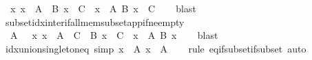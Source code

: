\begin{isabellebody}
\ \ {\isachardoublequoteopen}{\isacharparenleft}{\kern0pt}{\isasymAnd}x{\isachardot}{\kern0pt}\ x\ {\isasymin}\ A\ {\isasymLongrightarrow}\ B\ x\ {\isasymsubseteq}\ C{\isacharparenright}{\kern0pt}\ {\isasymLongrightarrow}\ {\isacharparenleft}{\kern0pt}{\isasymUnion}x\ {\isasymin}\ A{\isachardot}{\kern0pt}\ B\ x{\isacharparenright}{\kern0pt}\ {\isasymsubseteq}\ C{\isachardoublequoteclose}\isanewline
%
\isadelimproof
\ \ %
\endisadelimproof
%
\isatagproof
{}\isamarkupfalse%
\ blast%
\endisatagproof
{\isafoldproof}%
%
\isadelimproof
\isanewline
%
\endisadelimproof
\isanewline
{}\isamarkupfalse%
\ subset{\isacharunderscore}{\kern0pt}idx{\isacharunderscore}{\kern0pt}inter{\isacharunderscore}{\kern0pt}if{\isacharunderscore}{\kern0pt}all{\isacharunderscore}{\kern0pt}mem{\isacharunderscore}{\kern0pt}subset{\isacharunderscore}{\kern0pt}app{\isacharunderscore}{\kern0pt}if{\isacharunderscore}{\kern0pt}ne{\isacharunderscore}{\kern0pt}empty{\isacharcolon}{\kern0pt}\isanewline
\ \ {\isachardoublequoteopen}{\isasymlbrakk}A\ {\isasymnoteq}\ {\isacharbraceleft}{\kern0pt}{\isacharbraceright}{\kern0pt}{\isacharsemicolon}{\kern0pt}\ {\isasymAnd}x{\isachardot}{\kern0pt}\ x\ {\isasymin}\ A\ {\isasymLongrightarrow}\ C\ {\isasymsubseteq}\ B\ x{\isasymrbrakk}\ {\isasymLongrightarrow}\ C\ {\isasymsubseteq}\ {\isacharparenleft}{\kern0pt}{\isasymInter}x\ {\isasymin}\ A{\isachardot}{\kern0pt}\ B\ x{\isacharparenright}{\kern0pt}{\isachardoublequoteclose}\isanewline
%
\isadelimproof
\ \ %
\endisadelimproof
%
\isatagproof
{}\isamarkupfalse%
\ blast%
\endisatagproof
{\isafoldproof}%
%
\isadelimproof
\isanewline
%
\endisadelimproof
\isanewline
{}\isamarkupfalse%
\ idx{\isacharunderscore}{\kern0pt}union{\isacharunderscore}{\kern0pt}singleton{\isacharunderscore}{\kern0pt}eq\ {\isacharbrackleft}{\kern0pt}simp{\isacharbrackright}{\kern0pt}{\isacharcolon}{\kern0pt}\ {\isachardoublequoteopen}{\isacharparenleft}{\kern0pt}{\isasymUnion}x\ {\isasymin}\ A{\isachardot}{\kern0pt}\ {\isacharbraceleft}{\kern0pt}x{\isacharbraceright}{\kern0pt}{\isacharparenright}{\kern0pt}\ {\isacharequal}{\kern0pt}\ A{\isachardoublequoteclose}\isanewline
%
\isadelimproof
\ \ %
\endisadelimproof
%
\isatagproof
{}\isamarkupfalse%
\ {\isacharparenleft}{\kern0pt}rule\ eq{\isacharunderscore}{\kern0pt}if{\isacharunderscore}{\kern0pt}subset{\isacharunderscore}{\kern0pt}if{\isacharunderscore}{\kern0pt}subset{\isacharparenright}{\kern0pt}\ auto%
\endisatagproof
{\isafoldproof}%
%
\isadelimproof
\isanewline
%
\endisadelimproof
\isanewline
{}\isamarkupfalse%

\end{isabellebody}
